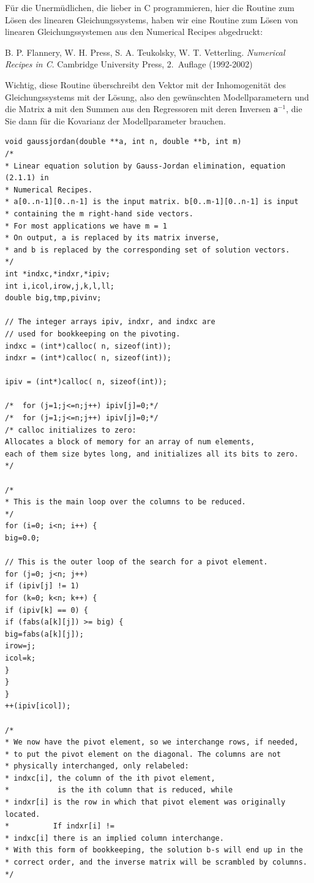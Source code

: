 \pagebreak

Für die Unermüdlichen, die lieber in C programmieren, hier die Routine zum Lösen
des linearen Gleichungssystems, haben wir eine Routine zum Lösen von linearen
Gleichungssystemen aus den Numerical Recipes abgedruckt:

B. P. Flannery, W. H. Press, S. A. Teukolsky, W. T. Vetterling. \textsl{Numerical Recipes
in C}. Cambridge University Press, 2.~Auflage (1992-2002)

Wichtig, diese Routine überschreibt den Vektor mit der Inhomogenität des Gleichungssystems
mit der Lösung, also den gewünschten Modellparametern und 
die Matrix \texttt{a} mit den Summen aus den Regressoren mit deren Inversen
\texttt{a}$^{-1}$, die Sie dann für die Kovarianz der Modellparameter brauchen.

\begin{verbatim}
void gaussjordan(double **a, int n, double **b, int m)
/*
* Linear equation solution by Gauss-Jordan elimination, equation (2.1.1) in
* Numerical Recipes.
* a[0..n-1][0..n-1] is the input matrix. b[0..m-1][0..n-1] is input
* containing the m right-hand side vectors.
* For most applications we have m = 1
* On output, a is replaced by its matrix inverse,
* and b is replaced by the corresponding set of solution vectors.
*/
int *indxc,*indxr,*ipiv;
int i,icol,irow,j,k,l,ll;
double big,tmp,pivinv;

// The integer arrays ipiv, indxr, and indxc are
// used for bookkeeping on the pivoting.
indxc = (int*)calloc( n, sizeof(int));
indxr = (int*)calloc( n, sizeof(int));

ipiv = (int*)calloc( n, sizeof(int));

/*	for (j=1;j<=n;j++) ipiv[j]=0;*/
/*	for (j=1;j<=n;j++) ipiv[j]=0;*/
/* calloc initializes to zero:
Allocates a block of memory for an array of num elements,
each of them size bytes long, and initializes all its bits to zero.
*/

/*
* This is the main loop over the columns to be reduced.
*/
for (i=0; i<n; i++) {
big=0.0;

// This is the outer loop of the search for a pivot element.
for (j=0; j<n; j++)
if (ipiv[j] != 1)
for (k=0; k<n; k++) {
if (ipiv[k] == 0) {
if (fabs(a[k][j]) >= big) {
big=fabs(a[k][j]);
irow=j;
icol=k;
}
}
}
++(ipiv[icol]);

/*
* We now have the pivot element, so we interchange rows, if needed,
* to put the pivot element on the diagonal. The columns are not
* physically interchanged, only relabeled:
* indxc[i], the column of the ith pivot element,
*           is the ith column that is reduced, while
* indxr[i] is the row in which that pivot element was originally located.
*          If indxr[i] !=
* indxc[i] there is an implied column interchange.
* With this form of bookkeeping, the solution b-s will end up in the
* correct order, and the inverse matrix will be scrambled by columns.
*/


\end{verbatim}
